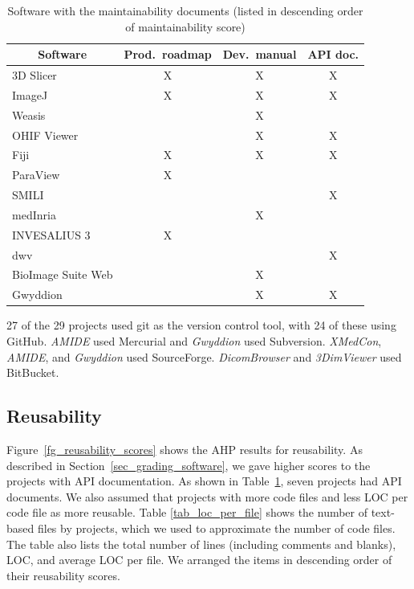 \documentclass[final, 3p, times, authoryear]{elsarticle}
\begin{document}
\begin{table}[!ht]
\centering
\begin{tabular}{lccc}
\toprule
\multicolumn{1}{c}{Software} & Prod.\ roadmap & Dev.\ manual & API doc. \\ 
\midrule
3D Slicer & X & X & X \\
ImageJ & X & X & X \\
Weasis &  & X &  \\
OHIF Viewer &  & X & X \\
Fiji & X & X & X \\
ParaView & X &  &  \\
SMILI &  &  & X \\
medInria &  & X &  \\
INVESALIUS 3 & X &  &  \\
dwv &  &  & X \\
BioImage Suite Web &  & X &  \\
Gwyddion &  & X & X \\ 
\bottomrule
\end{tabular}
\caption{Software with the maintainability documents (listed in descending order of 
maintainability score)}
\label{tab_maintainability_docs}
\end{table}

27 of the 29 projects used git as the version control tool, with 24 of these
using GitHub. \textit{AMIDE} used Mercurial and \textit{Gwyddion} used
Subversion. \textit{XMedCon}, \textit{AMIDE}, and \textit{Gwyddion} used
SourceForge. \textit{DicomBrowser} and \textit{3DimViewer} used BitBucket. 

\subsection{Reusability} \label{sec_result_reusability}

Figure~\ref{fg_reusability_scores} shows the AHP results for reusability. As
described in Section~\ref{sec_grading_software}, we gave higher scores to the
projects with API documentation. As shown in
Table~\ref{tab_maintainability_docs}, seven projects had API documents. We also
assumed that projects with more code files and less LOC per code file as more
reusable. Table \ref{tab_loc_per_file} shows the number of text-based files by
projects, which we used to approximate the number of code files. The table also
lists the total number of lines (including comments and blanks), LOC, and
average LOC per file. We arranged the items in descending order of their
reusability scores.
\end{document}
